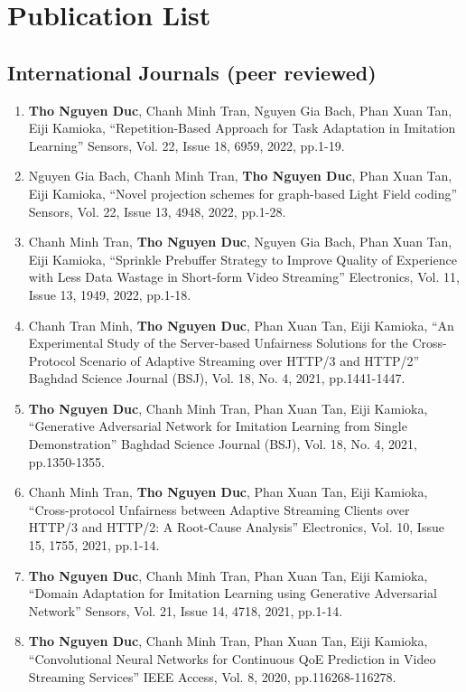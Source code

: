 \chapter{Publication List}

\section*{International Journals (peer reviewed)}

\begin{enumerate}
  \item \textbf{Tho Nguyen Duc}, Chanh Minh Tran, Nguyen Gia Bach, Phan Xuan Tan, Eiji Kamioka, ``Repetition-Based Approach for Task Adaptation in Imitation Learning'' Sensors, Vol. 22, Issue 18, 6959, 2022, pp.1-19.
  \item Nguyen Gia Bach, Chanh Minh Tran, \textbf{Tho Nguyen Duc}, Phan Xuan Tan, Eiji Kamioka, ``Novel projection schemes for graph-based Light Field coding'' Sensors, Vol. 22, Issue 13, 4948, 2022, pp.1-28.
  \item Chanh Minh Tran, \textbf{Tho Nguyen Duc}, Nguyen Gia Bach, Phan Xuan Tan, Eiji Kamioka, ``Sprinkle Prebuffer Strategy to Improve Quality of Experience with Less Data Wastage in Short-form Video Streaming'' Electronics, Vol. 11, Issue 13, 1949, 2022, pp.1-18.
  \item Chanh Tran Minh, \textbf{Tho Nguyen Duc}, Phan Xuan Tan, Eiji Kamioka, ``An Experimental Study of the Server-based Unfairness Solutions for the Cross-Protocol Scenario of Adaptive Streaming over HTTP/3 and HTTP/2'' Baghdad Science Journal (BSJ), Vol. 18, No. 4, 2021, pp.1441-1447.
  \item \textbf{Tho Nguyen Duc}, Chanh Minh Tran, Phan Xuan Tan, Eiji Kamioka, ``Generative Adversarial Network for Imitation Learning from Single Demonstration'' Baghdad Science Journal (BSJ), Vol. 18, No. 4, 2021, pp.1350-1355.
  \item Chanh Minh Tran, \textbf{Tho Nguyen Duc}, Phan Xuan Tan, Eiji Kamioka, ``Cross-protocol Unfairness between Adaptive Streaming Clients over HTTP/3 and HTTP/2: A Root-Cause Analysis'' Electronics, Vol. 10, Issue 15, 1755, 2021, pp.1-14.
  \item \textbf{Tho Nguyen Duc}, Chanh Minh Tran, Phan Xuan Tan, Eiji Kamioka, ``Domain Adaptation for Imitation Learning using Generative Adversarial Network'' Sensors, Vol. 21, Issue 14, 4718, 2021, pp.1-14.
  \item \textbf{Tho Nguyen Duc}, Chanh Minh Tran, Phan Xuan Tan, Eiji Kamioka, ``Convolutional Neural Networks for Continuous QoE Prediction in Video Streaming Services'' IEEE Access, Vol. 8, 2020, pp.116268-116278.

\end{enumerate}
